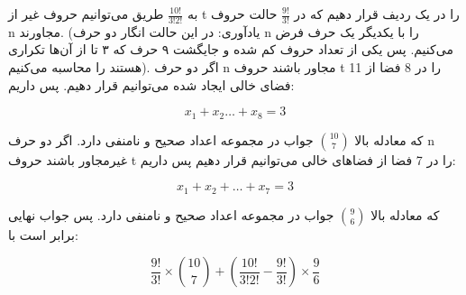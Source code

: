 \p
به
$\frac{10!}{3!2!}$
طریق می‌توانیم حروف غیر از t را در یک ردیف قرار دهیم که در 
$\frac{9!}{3!}$
حالت حروف n مجاورند.
(یادآوری: در این حالت انگار دو حرف n را با یکدیگر یک حرف فرض می‌کنیم. پس یکی از تعداد حروف کم شده و جایگشت ۹ حرف که ۳ تا از آن‌ها تکراری هستند را محاسبه می‌کنیم).
اگر دو حرف n مجاور باشند حروف t را در 8 فضا از 11 فضای خالی ایجاد شده می‌توانیم قرار دهیم. پس داریم:

$$x_1 + x_2 \ldots + x_8 = 3$$

که معادله بالا 
$\binom{10}{7}$
جواب در مجموعه اعداد صحیح و نامنفی دارد.
اگر دو حرف n غیرمجاور باشند حروف t را در 7 فضا از فضاهای خالی می‌توانیم قرار دهیم پس داریم:

$$x_1 + x_2 + \ldots + x_7 = 3$$

که معادله بالا 
$\binom{9}{6}$
جواب در مجموعه اعداد صحیح و نامنفی دارد. 
پس جواب نهایی برابر است با:

$$\frac{9!}{3!}\times\binom{10}{7} + (\frac{10!}{3!2!} - \frac{9!}{3!})\times\frac{9}{6}$$